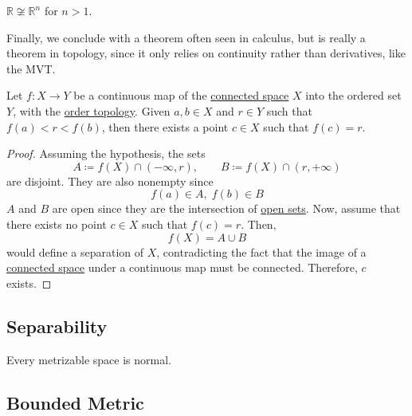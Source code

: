   \begin{corollary}
    \label{thm:rnotcongrn-for-n1}
    $\mathbb{R} \not\cong \mathbb{R}^n$ for $n > 1$. 
  \end{corollary}

  Finally, we conclude with a theorem often seen in calculus, but is really a theorem in topology, since it only relies on continuity rather than derivatives, like the MVT. 

  \begin{theorem}
    \label{thm:intermediate-value-theorem}
    Let $f: X \to Y$ be a continuous map of the \hyperref[def:connected-space]{connected space} $X$ into the ordered set $Y$, with the \hyperref[def:order-topology]{order topology}. Given $a, b \in X$ and $r \in Y$ such that $f(a)<r<f(b)$, then there exists a point $c \in X$ such that $f(c) = r$. 
  \end{theorem}
  \begin{proof}
    Assuming the hypothesis, the sets 
    \begin{equation}
      A \coloneqq f(X) \cap (-\infty, r), \qquad B \coloneqq f(X) \cap (r, +\infty)
    \end{equation}
    are disjoint. They are also nonempty since 
    \begin{equation}
      f(a) \in A, \; f(b) \in B
    \end{equation}
    $A$ and $B$ are open since they are the intersection of \hyperref[def:open-set]{open sets}. Now, assume that there exists no point $c \in X$ such that $f(c) = r$. Then, 
    \begin{equation}
      f(X) = A \cup B
    \end{equation}
    would define a separation of $X$, contradicting the fact that the image of a \hyperref[def:connected-space]{connected space} under a continuous map must be connected. Therefore, $c$ exists. 
  \end{proof}  

\subsection{Separability} 

  \begin{theorem}
    \label{thm:metrizable-spaces-are-normal}
    Every metrizable space is normal. 
  \end{theorem}

\subsection{Bounded Metric}

